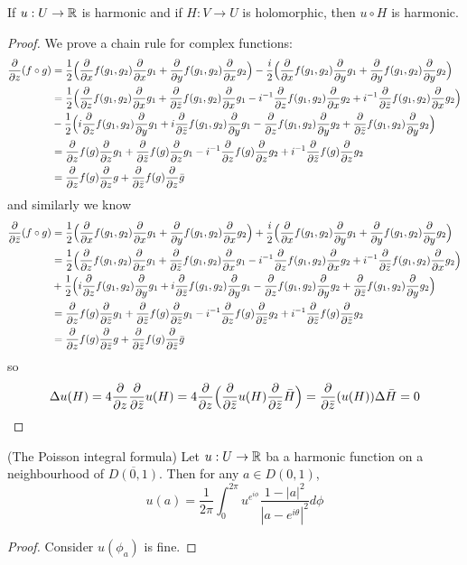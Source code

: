 \begin{lemma}
    If $u:U\to\R$ is harmonic and if $H:V\to U$ is holomorphic, then $u\circ H$ is harmonic.
\end{lemma}
\begin{proof}
    We prove a chain rule for complex functions:
    \[
    \begin{aligned}
    \ParZ(f\circ g) &= \dfrac{1}{2}\Big(\ParX f(g_1,g_2)\ParX g_1+\ParY f(g_1,g_2)\ParX g_2\Big)-\dfrac{i}{2}\Big(\ParX f(g_1,g_2)\ParY g_1+\ParY f(g_1,g_2)\ParY g_2\Big) \\
    &= \dfrac{1}{2}\Big( \ParZ f(g_1,g_2)\ParX g_1+\ParbZ f(g_1,g_2)\ParX g_1-i^{-1}\ParZ f(g_1,g_2)\ParX g_2+i^{-1}\ParbZ f(g_1,g_2)\ParX g_2\Big)
    \\ & - \dfrac{1}{2}\Big( i\ParZ f(g_1,g_2)\ParY g_1+i\ParbZ f(g_1,g_2)\ParY g_1-\ParZ f(g_1,g_2)\ParY g_2+\ParbZ f(g_1,g_2)\ParY g_2\Big)
    \\& = \ParZ f(g)\ParZ g_1+\ParbZ f(g)\ParZ g_1 -i^{-1}\ParZ f(g)\ParZ g_2 + i^{-1}\ParbZ f(g)\ParZ g_2
    \\& = \ParZ f(g)\ParZ {g} + \ParbZ f(g)\ParZ \bar{g}
    \end{aligned}
    \]
    and similarly we know
    \[
    \begin{aligned}
    \ParbZ(f\circ g) &= \dfrac{1}{2}\Big(\ParX f(g_1,g_2)\ParX g_1+\ParY f(g_1,g_2)\ParX g_2\Big)+\dfrac{i}{2}\Big(\ParX f(g_1,g_2)\ParY g_1+\ParY f(g_1,g_2)\ParY g_2\Big) \\
    &= \dfrac{1}{2}\Big( \ParZ f(g_1,g_2)\ParX g_1+\ParbZ f(g_1,g_2)\ParX g_1-i^{-1}\ParZ f(g_1,g_2)\ParX g_2+i^{-1}\ParbZ f(g_1,g_2)\ParX g_2\Big)
    \\ & + \dfrac{1}{2}\Big( i\ParZ f(g_1,g_2)\ParY g_1+i\ParbZ f(g_1,g_2)\ParY g_1-\ParZ f(g_1,g_2)\ParY g_2+\ParbZ f(g_1,g_2)\ParY g_2\Big)
    \\& = \ParZ f(g)\ParbZ g_1+\ParbZ f(g)\ParbZ g_1 -i^{-1}\ParZ f(g)\ParbZ g_2 + i^{-1}\ParbZ f(g)\ParbZ g_2
    \\& = \ParZ f(g)\ParbZ {g} + \ParbZ f(g)\ParbZ \bar{g}
    \end{aligned}
    \]
    so
    \[
    \Delta u(H) = 4\ParZ\ParbZ u(H) = 4\ParZ\Big(\ParbZ u(H)\ParbZ \bar{H}\Big) = \ParbZ(u(H))\Delta \bar{H} = 0
    \]
\end{proof}

\begin{theorem}
    (The Poisson integral formula) Let $u:U\to\R$ ba a harmonic function on a neighbourhood of $\overline{D(0,1)}$. Then for any $a\in D(0,1)$,
    \[u(a) = \dfrac{1}{2\pi}\int_0^{2\pi} u^{e^{i\phi}}\dfrac{1-|a|^2}{|a-e^{i\theta}|^2}d\phi\]
\end{theorem}
\begin{proof}
    Consider $u(\phi_a)$ is fine.
\end{proof}

